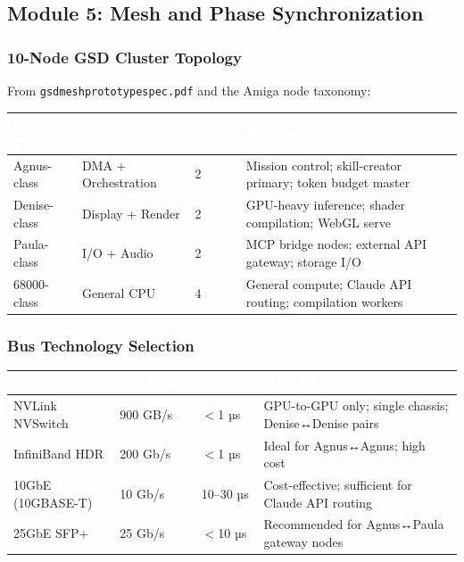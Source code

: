 \documentclass[11pt,letterpaper]{article}
\newcommand{\tableheader}[1]{\textbf{\sffamily\textcolor{white}{#1}}}
\begin{document}
\subsection{Module 5: Mesh and Phase Synchronization}

\subsubsection{10-Node GSD Cluster Topology}

From \texttt{gsdmeshprototypespec.pdf} and the Amiga node taxonomy:

\begin{center}
\begin{tabularx}{\textwidth}{L{2.5cm}L{2.5cm}L{2cm}X}
\toprule
{}
\tableheader{Node Type} & \tableheader{Amiga Role} & \tableheader{Count} & \tableheader{Function} \\
\midrule
Agnus-class & DMA + Orchestration & 2 & Mission control; skill-creator primary; token budget master \\
Denise-class & Display + Render & 2 & GPU-heavy inference; shader compilation; WebGL serve \\
Paula-class & I/O + Audio & 2 & MCP bridge nodes; external API gateway; storage I/O \\
68000-class & General CPU & 4 & General compute; Claude API routing; compilation workers \\
\bottomrule
\end{tabularx}
\end{center}

\subsubsection{Bus Technology Selection}

\begin{center}
\begin{tabularx}{\textwidth}{L{3cm}L{2.5cm}L{2cm}X}
\toprule
{}
\tableheader{Technology} & \tableheader{Bandwidth} & \tableheader{Latency} & \tableheader{GSD Fit} \\
\midrule
NVLink NVSwitch & 900 GB/s & $<$1 µs & GPU-to-GPU only; single chassis; Denise↔Denise pairs \\
InfiniBand HDR & 200 Gb/s & $<$1 µs & Ideal for Agnus↔Agnus; high cost \\
10GbE (10GBASE-T) & 10 Gb/s & 10--30 µs & Cost-effective; sufficient for Claude API routing \\
25GbE SFP+ & 25 Gb/s & $<$10 µs & Recommended for Agnus↔Paula gateway nodes \\
\bottomrule
\end{tabularx}
\end{center}
\end{document}
